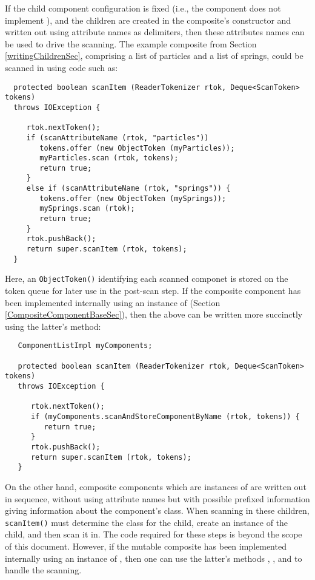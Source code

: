 \documentclass{article}
\begin{document}
If the child component configuration is fixed
(i.e., the component
does not implement
),
and the children are created in the composite's constructor
and written out using attribute names as delimiters,
then these attributes names can be used to drive the scanning.
The example composite from Section \ref{writingChildrenSec},
comprising a list of particles and a list of springs, 
could be scanned in using code such as:
\begin{lstlisting}
  protected boolean scanItem (ReaderTokenizer rtok, Deque<ScanToken> tokens)
  throws IOException {

     rtok.nextToken();
     if (scanAttributeName (rtok, "particles")) 
        tokens.offer (new ObjectToken (myParticles));
        myParticles.scan (rtok, tokens);
        return true;
     }
     else if (scanAttributeName (rtok, "springs")) {
        tokens.offer (new ObjectToken (mySprings));
        mySprings.scan (rtok);
        return true;
     }
     rtok.pushBack();     
     return super.scanItem (rtok, tokens);
  }
\end{lstlisting}
Here, an {\tt ObjectToken()} identifying each scanned componet is
stored on the token queue for later use in the post-scan step.  If the
composite component has been implemented internally using an instance
of  (Section
\ref{CompositeComponentBaseSec}), then the above can be written more
succinctly using the latter's
method:
\begin{lstlisting}
   ComponentListImpl myComponents; 

   protected boolean scanItem (ReaderTokenizer rtok, Deque<ScanToken> tokens)
   throws IOException {

      rtok.nextToken();
      if (myComponents.scanAndStoreComponentByName (rtok, tokens)) {
         return true;
      }
      rtok.pushBack();     
      return super.scanItem (rtok, tokens);
   }
\end{lstlisting}

On the other hand, composite components which are instances of
 are
written out in sequence, without using attribute names but with
possible prefixed information giving information about the component's
class. When scanning in these children, {\tt scanItem()} must
determine the class for the child, create an instance of the child,
and then scan it in. The code required for these steps is beyond the
scope of this document. However, if the mutable composite
has been implemented internally using an instance of
, then one can
use the latter's methods 
,
,
and 
to handle the scanning.
\end{document}
